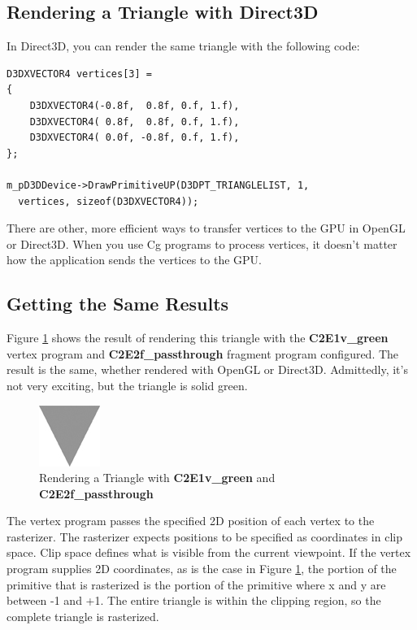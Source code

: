 \documentclass{book}
\begin{document}
\subsection{Rendering a Triangle with Direct3D}

In Direct3D, you can render the same triangle with the following code:

\FloatBarrier
\begin{lstlisting}
D3DXVECTOR4 vertices[3] =
{
    D3DXVECTOR4(-0.8f,  0.8f, 0.f, 1.f),
    D3DXVECTOR4( 0.8f,  0.8f, 0.f, 1.f),
    D3DXVECTOR4( 0.0f, -0.8f, 0.f, 1.f),
};

m_pD3DDevice->DrawPrimitiveUP(D3DPT_TRIANGLELIST, 1,
  vertices, sizeof(D3DXVECTOR4));
\end{lstlisting}
\FloatBarrier

There are other, more efficient ways to transfer vertices to the GPU in OpenGL or Direct3D. When you use Cg programs to process vertices, it doesn't matter how the application sends the vertices to the GPU.

\subsection{Getting the Same Results}

Figure \ref{fig:2-5} shows the result of rendering this triangle with the \textbf{C2E1v_green} vertex program and \textbf{C2E2f_passthrough} fragment program configured. The result is the same, whether rendered with OpenGL or Direct3D. Admittedly, it's not very exciting, but the triangle is solid green.

\begin{figure}
    \centering
    \includegraphics[width=0.25\linewidth]{Images/fig_0006.jpg}
    \caption{Rendering a Triangle with \textbf{C2E1v_green} and \textbf{C2E2f_passthrough}}
    \label{fig:2-5}
\end{figure}

The vertex program passes the specified 2D position of each vertex to the rasterizer. The rasterizer expects positions to be specified as coordinates in clip space. Clip space defines what is visible from the current viewpoint. If the vertex program supplies 2D coordinates, as is the case in Figure \ref{fig:2-5}, the portion of the primitive that is rasterized is the portion of the primitive where x and y are between -1 and +1. The entire triangle is within the clipping region, so the complete triangle is rasterized.
\end{document}
